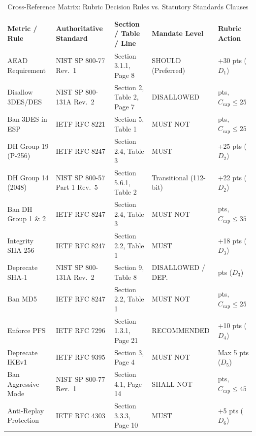 \documentclass[11pt,a4paper]{article}
\begin{document}
\begin{table}[h!]
\centering
\small
\begin{tabularx}{\textwidth}{>{\raggedright\arraybackslash}p{2.7cm} >{\raggedright\arraybackslash}p{3.3cm} >{\raggedright\arraybackslash}X >{\centering\arraybackslash}p{2.5cm} >{\raggedleft\arraybackslash}p{2.4cm}}
\toprule
\textbf{Metric / Rule} & \textbf{Authoritative Standard} & \textbf{Section / Table / Line} & \textbf{Mandate Level} & \textbf{Rubric Action} \\
\midrule
AEAD Requirement & NIST SP 800-77 Rev.~1 & Section 3.1.1, Page 8 & SHOULD (Preferred) & +30 pts ($D_1$) \\
Disallow 3DES/DES & NIST SP 800-131A Rev.~2 & Section 2, Table 2, Page 7 & DISALLOWED & 0 pts, $C_{\text{cap}} \le 25$ \\
Ban 3DES in ESP & IETF RFC 8221 & Section 5, Table 1 & MUST NOT & 0 pts, $C_{\text{cap}} \le 25$ \\
DH Group 19 (P-256) & IETF RFC 8247 & Section 2.4, Table 3 & MUST & +25 pts ($D_2$) \\
DH Group 14 (2048) & NIST SP 800-57 Part 1 Rev.~5 & Section 5.6.1, Table 2 & Transitional (112-bit) & +22 pts ($D_2$) \\
Ban DH Group 1 \& 2 & IETF RFC 8247 & Section 2.4, Table 3 & MUST NOT & 0 pts, $C_{\text{cap}} \le 35$ \\
Integrity SHA-256 & IETF RFC 8247 & Section 2.2, Table 1 & MUST & +18 pts ($D_3$) \\
Deprecate SHA-1 & NIST SP 800-131A Rev.~2 & Section 9, Table 8 & DISALLOWED / DEP. & 5 pts ($D_3$) \\
Ban MD5 & IETF RFC 8247 & Section 2.2, Table 1 & MUST NOT & 0 pts, $C_{\text{cap}} \le 25$ \\
Enforce PFS & IETF RFC 7296 & Section 1.3.1, Page 21 & RECOMMENDED & +10 pts ($D_4$) \\
Deprecate IKEv1 & IETF RFC 9395 & Section 3, Page 4 & MUST NOT & Max 5 pts ($D_5$) \\
Ban Aggressive Mode & NIST SP 800-77 Rev.~1 & Section 4.1, Page 14 & SHALL NOT & 0 pts, $C_{\text{cap}} \le 45$ \\
Anti-Replay Protection & IETF RFC 4303 & Section 3.3.3, Page 10 & MUST & +5 pts ($D_6$) \\
\bottomrule
\end{tabularx}
\caption{Cross-Reference Matrix: Rubric Decision Rules vs. Statutory Standards Clauses}
\label{tab:traceability}
\end{table}
\end{document}
